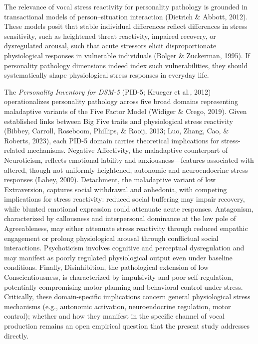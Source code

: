 \documentclass[
  english,
  man]{apa6}
\begin{document}
The relevance of vocal stress reactivity for personality pathology is grounded in transactional models of person--situation interaction (Dietrich \& Abbott, 2012). These models posit that stable individual differences reflect differences in stress sensitivity, such as heightened threat reactivity, impaired recovery, or dysregulated arousal, such that acute stressors elicit disproportionate physiological responses in vulnerable individuals (Bolger \& Zuckerman, 1995). If personality pathology dimensions indeed index such vulnerabilities, they should systematically shape physiological stress responses in everyday life.

The \emph{Personality Inventory for DSM-5} (PID-5; Krueger et al., 2012) operationalizes personality pathology across five broad domains representing maladaptive variants of the Five Factor Model (Widiger \& Crego, 2019). Given established links between Big Five traits and physiological stress reactivity (Bibbey, Carroll, Roseboom, Phillips, \& Rooij, 2013; Luo, Zhang, Cao, \& Roberts, 2023), each PID-5 domain carries theoretical implications for stress-related mechanisms. Negative Affectivity, the maladaptive counterpart of Neuroticism, reflects emotional lability and anxiousness---features associated with altered, though not uniformly heightened, autonomic and neuroendocrine stress responses (Lahey, 2009). Detachment, the maladaptive variant of low Extraversion, captures social withdrawal and anhedonia, with competing implications for stress reactivity: reduced social buffering may impair recovery, while blunted emotional expression could attenuate acute responses. Antagonism, characterized by callousness and interpersonal dominance at the low pole of Agreeableness, may either attenuate stress reactivity through reduced empathic engagement or prolong physiological arousal through conflictual social interactions. Psychoticism involves cognitive and perceptual dysregulation and may manifest as poorly regulated physiological output even under baseline conditions. Finally, Disinhibition, the pathological extension of low Conscientiousness, is characterized by impulsivity and poor self-regulation, potentially compromising motor planning and behavioral control under stress. Critically, these domain-specific implications concern general physiological stress mechanisms (e.g., autonomic activation, neuroendocrine regulation, motor control); whether and how they manifest in the specific channel of vocal production remains an open empirical question that the present study addresses directly.
\end{document}

